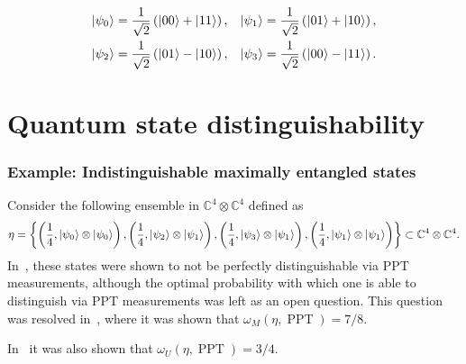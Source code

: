 \documentclass[11pt]{article}
\theoremstyle{definition}
\newcommand{\microspace}{\mspace{0.5mu}}
\newcommand{\PPT}{\operatorname{PPT}}
\newcommand{\ket}[1]{
  \lvert\microspace #1 \microspace \rangle}
\newcommand{\complex}{\mathbb{C}}
\begin{document}
\begin{equation}
    \begin{aligned}
        \ket{\psi_0} = \frac{1}{\sqrt{2}} \left(\ket{00} + \ket{11} \right), &\quad
        \ket{\psi_1} = \frac{1}{\sqrt{2}} \left(\ket{01} + \ket{10} \right), \\
        \ket{\psi_2} = \frac{1}{\sqrt{2}} \left(\ket{01} - \ket{10} \right), &\quad
        \ket{\psi_3} = \frac{1}{\sqrt{2}} \left(\ket{00} - \ket{11} \right).
    \end{aligned}
\end{equation}

\section{Quantum state distinguishability}
\label{sec:qsd}

\subsubsection*{Example: Indistinguishable maximally entangled states}
\label{sec:indistinguishable_mes}

Consider the following ensemble in $\complex^4 \otimes \complex^4$ defined as
\begin{equation}\label{eq:ydy_ensemble}
    \eta = \left\{ \left(\frac{1}{4}, \ket{\psi_0} \otimes \ket{\psi_0} \right), 
                  \left(\frac{1}{4}, \ket{\psi_2} \otimes \ket{\psi_1} \right),
                  \left(\frac{1}{4}, \ket{\psi_3} \otimes \ket{\psi_1} \right),
                  \left(\frac{1}{4}, \ket{\psi_1} \otimes \ket{\psi_1} \right) 
            \right\} \subset \complex^4 \otimes \complex^4.
\end{equation}
In~\cite{yu2012four}, these states were shown to not be perfectly
distinguishable via PPT measurements, although the optimal probability with
which one is able to distinguish via PPT measurements was left as an open
question. This question was resolved in~\cite{cosentino2013positive}, where it
was shown that $\omega_M(\eta, \PPT) = 7/8$.

In~\cite{cosentino2013positive} it was also shown that $\omega_U(\eta, \PPT) = 3/4$.
\end{document}
